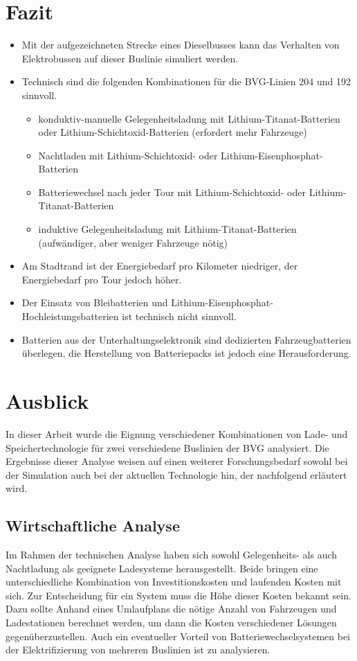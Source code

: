\section{Fazit}
\begin{itemize}
	\item Mit der aufgezeichneten Strecke eines Dieselbusses kann das Verhalten von Elektrobussen auf dieser Buslinie simuliert werden.
	\item Technisch sind die folgenden Kombinationen für die BVG-Linien 204 und 192 sinnvoll.
	\begin{itemize}
		\item konduktiv-manuelle Gelegenheitsladung mit Lithium-Titanat-Batterien oder Lithium-Schichtoxid-Batterien (erfordert mehr Fahrzeuge)
		\item Nachtladen mit Lithium-Schichtoxid- oder Lithium-Eisenphosphat-Batterien
		\item Batteriewechsel nach jeder Tour mit Lithium-Schichtoxid- oder Lithium-Titanat-Batterien
		\item induktive Gelegenheitsladung mit Lithium-Titanat-Batterien (aufwändiger, aber weniger Fahrzeuge nötig)
	\end{itemize}
	\item Am Stadtrand ist der Energiebedarf pro Kilometer niedriger, der Energiebedarf pro Tour jedoch höher.
	\item Der Einsatz von Bleibatterien und Lithium-Eisenphosphat-Hochleistungsbatterien ist technisch nicht sinnvoll.
	\item Batterien aus der Unterhaltungselektronik sind dedizierten Fahrzeugbatterien überlegen, die Herstellung von Batteriepacks ist jedoch eine Herausforderung.
\end{itemize}

\section{Ausblick}
In dieser Arbeit wurde die Eignung verschiedener Kombinationen von Lade- und Speichertechnologie für zwei verschiedene Buslinien der BVG analysiert. Die Ergebnisse dieser Analyse weisen auf einen weiterer Forschungsbedarf sowohl bei der Simulation auch bei der aktuellen Technologie hin, der nachfolgend erläutert wird.

\subsection{Wirtschaftliche Analyse}
Im Rahmen der technischen Analyse haben sich sowohl Gelegenheits- als auch Nachtladung als geeignete Ladesysteme herausgestellt. Beide bringen eine unterschiedliche Kombination von Investitionskosten und laufenden Kosten mit sich. Zur Entscheidung für ein System muss die Höhe dieser Kosten bekannt sein. Dazu sollte Anhand eines Umlaufplans die nötige Anzahl von Fahrzeugen und Ladestationen berechnet werden, um dann die Kosten verschiedener Lösungen gegenüberzustellen. Auch ein eventueller Vorteil von Batteriewechselsystemen bei der Elektrifizierung von mehreren Buslinien ist zu analysieren.

